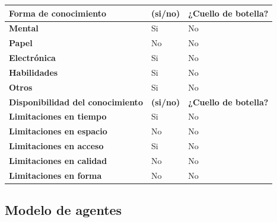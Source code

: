 \documentclass[a4paper,11pt]{article}
\begin{document}
\begin{center}
\begin{tabular}{| p{6.3cm} | l | p{3.8cm} |}
					\hline
					\cellcolor[RGB]{224,233,250}\textbf{Forma de conocimiento} &
					\cellcolor[RGB]{224,233,250}\textbf{(si/no)} &
					\cellcolor[RGB]{224,233,250}\textbf{¿Cuello de botella?}\\
					\hline
					\cellcolor[RGB]{224,233,250}\textbf{Mental} & Si & No\\
					\hline
					\cellcolor[RGB]{224,233,250}\textbf{Papel} & No & No\\
					\hline
					\cellcolor[RGB]{224,233,250}\textbf{Electrónica} & Si & No\\
					\hline
					\cellcolor[RGB]{224,233,250}\textbf{Habilidades} & Si & No\\
					\hline
					\cellcolor[RGB]{224,233,250}\textbf{Otros} & Si & No\\
					\hline
					\cellcolor[RGB]{224,233,250}\textbf{Disponibilidad del conocimiento} &
					\cellcolor[RGB]{224,233,250}\textbf{(si/no)} &
					\cellcolor[RGB]{224,233,250}\textbf{¿Cuello de botella?}\\
					\hline
					\cellcolor[RGB]{224,233,250}\textbf{Limitaciones en tiempo} & Si & No\\
					\hline
					\cellcolor[RGB]{224,233,250}\textbf{Limitaciones en espacio} & No & No\\
					\hline
					\cellcolor[RGB]{224,233,250}\textbf{Limitaciones en acceso} & Si & No\\
					\hline
					\cellcolor[RGB]{224,233,250}\textbf{Limitaciones en calidad} & No & No\\
					\hline
					\cellcolor[RGB]{224,233,250}\textbf{Limitaciones en forma} & No & No\\
					\hline
				\end{tabular}
			\end{center}
			\newpage
		\subsection{Modelo de agentes}
\end{document}
